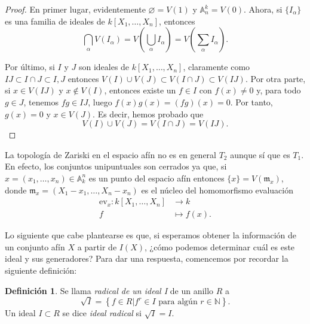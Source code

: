 \documentclass[12pt,a4paper]{article}
\theoremstyle{definition} \newtheorem{defn}[thm]{Definición}
\theoremstyle{definition} \newtheorem{ejemplo}[thm]{Ejemplo}
\theoremstyle{definition} \newtheorem{ejercicio}[thm]{Ejercicio}
\theoremstyle{remark} \newtheorem*{obs}{Observación}
\def\AA{\mathbb{A}}
\def\NN{\mathbb{N}}
\def\mm{\mathfrak{m}}
\begin{document}
\begin{proof}
  En primer lugar, evidentemente $\varnothing=V(1)$ y $\AA^k_n=V(0)$. Ahora, si $\{I_{\alpha}\}$ es una familia de ideales de $k[X_1,\dots,X_n]$, entonces 
  \begin{equation*}
    \bigcap_{\alpha} V(I_{\alpha})=V\left( \bigcup_{\alpha}I_{\alpha} \right)=V\left( \sum_{\alpha}I_{\alpha} \right).
  \end{equation*}

  Por último, si $I$ y $J$ son ideales de $k[X_1,\dots,X_n]$, claramente como $IJ\subset I\cap J \subset I, J$ entonces $V(I)\cup V(J) \subset V(I\cap J) \subset V(IJ)$. Por otra parte, si $x\in V(IJ)$ y $x \not\in V(I)$, entonces existe un $f\in I$ con $f(x)\neq 0$ y, para todo $g\in J$, tenemos $fg\in IJ$, luego $f(x)g(x)=(fg)(x)=0$. Por tanto, $g(x)=0$ y $x\in V(J)$. Es decir, hemos probado que 
\begin{equation*}
  V(I)\cup V(J)=V(I\cap J)=V(IJ).
  \end{equation*}
\end{proof}

La topología de Zariski en el espacio afín no es en general $T_2$ aunque sí que es $T_1$. En efecto, los conjuntos unipuntuales son cerrados ya que, si $x=(x_1,\dots,x_n)\in \AA_k^n$ es un punto del espacio afín entonces $\{x\}=V(\mm_x)$, donde $\mm_x=(X_1-x_1,\dots,X_n-x_n)$ es el núcleo del homomorfismo evaluación
\begin{align*}
  \mathrm{ev}_x :k[X_1,\dots,X_n]&\longrightarrow k\\ 
    f &\longmapsto f(x). 
  \end{align*}

  Lo siguiente que cabe plantearse es que, si esperamos obtener la información de un conjunto afín $X$ a partir de $I(X)$, ¿cómo podemos determinar cuál es este ideal y sus generadores? Para dar una respuesta, comencemos por recordar la siguiente definición:
  \begin{defn}
    Se llama \emph{radical de un ideal I} de un anillo $R$ a
    \begin{equation*}
      \sqrt{I}=\left\{ f\in R | f^r\in I \text{ para algún } r \in \NN \right\}.
    \end{equation*}
  Un ideal $I\subset R$ se dice \emph{ideal radical} si $\sqrt{I}=I$.
  \end{defn}
\end{document}
